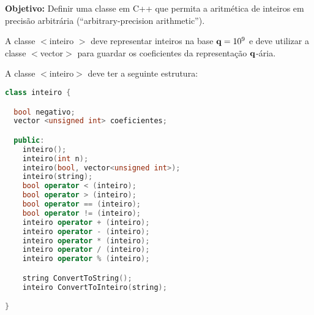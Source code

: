 
\usepackage{hyperref}
\newcommand{\shift}[1]{\setlength{\leftskip}{15 mm}{#1}\medskip}





\nextsect


{\bf Objetivo:} Definir uma classe em C++ que permita a aritmética de inteiros em precisão arbitrária (``arbitrary-precision arithmetic'').

 A classe $<$inteiro $>$ deve representar inteiros na base $\mathbf{q}=10^9$ e deve 
utilizar a classe $<$vector$>$ para guardar os coeficientes da representação $\mathbf{q}$-ária.

A classe $<$inteiro$>$ deve ter a seguinte estrutura:

\begin{lstlisting}[language=C++]
class inteiro {

  bool negativo; 
  vector <unsigned int> coeficientes;

  public:
    inteiro();
    inteiro(int n);
    inteiro(bool, vector<unsigned int>);
    inteiro(string);
    bool operator < (inteiro);
    bool operator > (inteiro);
    bool operator == (inteiro);
    bool operator != (inteiro);
    inteiro operator + (inteiro);
    inteiro operator - (inteiro);
    inteiro operator * (inteiro);
    inteiro operator / (inteiro);
    inteiro operator % (inteiro);

    string ConvertToString();
    inteiro ConvertToInteiro(string);

}
\end{lstlisting}


